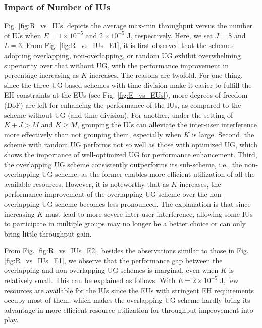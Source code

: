 \documentclass[12pt,draftclsnofoot, onecolumn]{IEEEtran}
\theoremstyle{plain}
\begin{document}
\begin{sloppypar}
\subsubsection{Impact of Number of IUs}
Fig. \ref{fig:R_vs_IUs} depicts the average max-min throughput versus the number of IUs when $E = 1 \times 10^{-5}$ and $2 \times 10^{-5}$ J, respectively. Here, we set $J = 8$ and $L = 3$. From Fig. \ref{fig:R_vs_IUs_E1}, it is first observed that the schemes adopting overlapping, non-overlapping, or random UG exhibit overwhelming superiority over that without UG, with the performance improvement in percentage increasing as $K$ increases. The reasons are twofold. For one thing, since the three UG-based schemes with time division make it easier to fulfill the EH constraints at the EUs (see Fig. \ref{fig:E_vs_EUs}), more degrees-of-freedom (DoF) are left for enhancing the performance of the IUs, as compared to the scheme without UG (and time division). For another, under the setting of $K + J > M$ and $K \geq M$, grouping the IUs can alleviate the inter-user interference more effectively than not grouping them, especially when $K$ is large. Second, the scheme with random UG performs not so well as those with optimized UG, which shows the importance of well-optimized UG for performance enhancement. Third, the overlapping UG scheme consistently outperforms its sub-scheme, i.e., the non-overlapping UG scheme, as the former enables more efficient utilization of all the available resources. However, it is noteworthy that as $K$ increases, the performance improvement of the overlapping UG scheme over the non-overlapping UG scheme becomes less pronounced. The explanation is that since increasing $K$ must lead to more severe inter-user interference, allowing some IUs to participate in multiple groups may no longer be a better choice or can only bring little throughput gain. %

From Fig. \ref{fig:R_vs_IUs_E2}, besides the
observations similar to those in Fig. \ref{fig:R_vs_IUs_E1}, we observe that the performance gap between the overlapping and non-overlapping UG schemes is marginal, even when $K$ is relatively small. This can be explained as follows. With $E = 2 \times 10^{-5}$ J, few resources are available for the IUs since the EUs with stringent EH requirements occupy most of them, which makes the overlapping UG scheme hardly bring its advantage in more efficient resource utilization for throughput improvement into play. 


\end{sloppypar}
\end{document}
